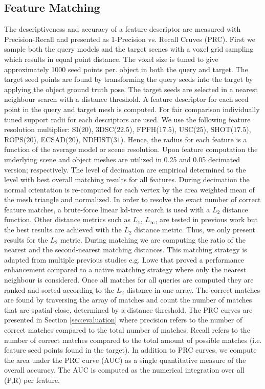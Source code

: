 \documentclass[10pt,twocolumn,letterpaper]{article}
\begin{document}
\subsection{Feature Matching}\label{sec:benchmark_matching}
The descriptiveness and accuracy of a feature descriptor are measured with Precision-Recall and presented as 1-Precision vs. Recall Cruves (PRC). First we sample both the query models and the target scenes with a voxel grid sampling \cite{RusuCousins2011} which results in equal point distance. The voxel size is tuned to give approximately 1000 seed points per. object in both the query and target. The target seed points are found by transforming the query seeds into the target by applying the object ground truth pose. The target seeds are selected in a nearest neighbour search with a distance threshold. A feature descriptor for each seed point in the query and target mesh is computed.  For fair comparison individually tuned support radii for each descriptors are used. We use the following feature resolution multiplier: SI($20$), 3DSC($22.5$), FPFH($17.5$), USC($25$), SHOT($17.5$), ROPS($20$), ECSAD($20$), NDHIST($31$). Hence, the radius for each feature is a function of the average model or scene resolution. Upon feature computation the underlying scene and object meshes are utilized in 0.25 and 0.05 decimated version; respectively. The level of decimation are empirical determined to the level with best overall matching results for all features. During decimation the normal orientation is re-computed for each vertex by the area weighted mean of the mesh triangle \cite{Thurmer1998} and normalized. In order to resolve the exact number of correct feature matches, a brute-force linear kd-tree search is	 used with a ${L_2}$ distance function. Other distance metrics such as ${L_1}$, ${L_\infty}$, are tested in previous work but the best results are achieved with the $L_2$ distance metric. Thus, we only present results for the ${L_2}$ metric. During matching we are computing the ratio of the nearest and the second-nearest matching distances. This matching strategy is adapted from multiple previous studies e.g. Lowe \etal \cite{Lowe2004} that proved a performance enhancement compared to a native matching strategy where only the nearest neighbour is considered. 
Once all matches for all queries are computed they are ranked and sorted according to the ${L_2}$ distance in one array. The correct matches are found by traversing the array of matches and count the number of matches that are spatial close, determined by a distance threshold. The PRC curves are presented in Section \ref{sec:evaluation} where precision refers to the number of correct matches compared to the total number of matches. Recall refers to the number of correct matches compared to the total amount of possible matches (i.e. feature seed points found in the target). In addition to PRC curves, we compute the area under the PRC curve (AUC) as a single quantitative measure of the overall accuracy. The AUC is computed as the numerical integration over all (P,R) per feature. %
\end{document}
